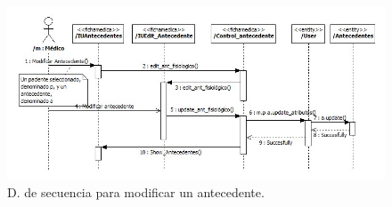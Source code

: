 				\begin{figure}[H]
				  \centering
				    \includegraphics[width=16cm]{img/jpg/secuencia/27_ficha_edit_ant.jpg}
				  \caption{D. de secuencia para modificar un antecedente.}
				  \label{fig:cont_ficha_ant_edit}
				\end{figure}
			


	
	

